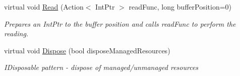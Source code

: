 \begin{DoxyCompactItemize}
virtual void \hyperlink{class_shared_memory_1_1_shared_buffer_aea88361c8c00b0159fe3dacc769a8465}{Read} (Action$<$ Int\+Ptr $>$ read\+Func, long buffer\+Position=0)
\begin{DoxyCompactList}\small\item\em Prepares an Int\+Ptr to the buffer position and calls {\itshape read\+Func}  to perform the reading. \end{DoxyCompactList}\item 
virtual void \hyperlink{class_shared_memory_1_1_shared_buffer_aa3db897346aa2c22a9d0d6b05ff7c058}{Dispose} (bool dispose\+Managed\+Resources)
\begin{DoxyCompactList}\small\item\em I\+Disposable pattern -\/ dispose of managed/unmanaged resources \end{DoxyCompactList}\end{DoxyCompactItemize}
